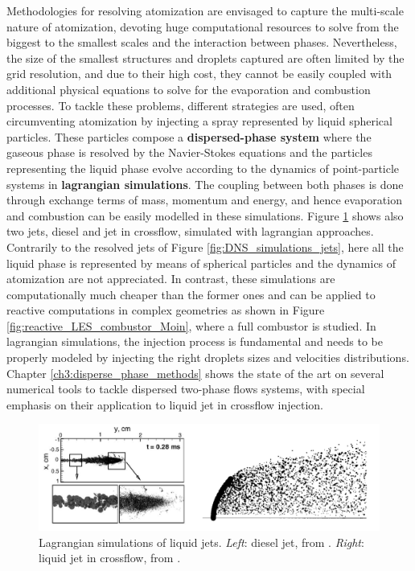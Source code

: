 Methodologies for resolving atomization are envisaged to capture the multi-scale nature of atomization, devoting huge computational resources to solve from the biggest to the smallest scales and the interaction between phases. Nevertheless, the size of the smallest structures and droplets captured are often limited by the grid resolution, and due to their high cost, they cannot be easily coupled with additional physical equations to solve for the evaporation and combustion processes. To tackle these problems, different strategies are used, often circumventing atomization by injecting a spray represented by liquid spherical particles. These particles compose a \textbf{dispersed-phase system} where the gaseous phase is resolved by the Navier-Stokes equations and the particles representing the liquid phase evolve according to the dynamics of point-particle systems in \textbf{lagrangian simulations}. The coupling between both phases is done through exchange terms of mass, momentum and energy, and hence evaporation and combustion can be easily modelled in these simulations. Figure \ref{fig:lagrangian_simulations_jets} shows also two jets, diesel and jet in crossflow, simulated with lagrangian approaches. Contrarily to the resolved jets of Figure \ref{fig:DNS_simulations_jets}, here all the liquid phase is represented by means of spherical particles and the dynamics of atomization are not appreciated. In contrast, these simulations are computationally much cheaper than the former ones and can be applied to reactive computations in complex geometries as shown in Figure \ref{fig:reactive_LES_combustor_Moin}, where a full combustor is studied. In lagrangian simulations, the injection process is fundamental and needs to be properly modeled by injecting the right droplets sizes and velocities distributions. Chapter \ref{ch3:disperse_phase_methods} shows the state of the art on several numerical tools to tackle dispersed two-phase flows systems, with special emphasis on their application to liquid jet in crossflow injection.

\begin{figure}[h!]
	\centering
   \includegraphics[scale=0.5]{./part0_intro/jets_lagrangian_simulations}
	\caption[Lagrangian simulations of liquid jets.]{Lagrangian simulations of liquid jets. \textsl{Left}: diesel jet, from  . \textsl{Right}: liquid jet in crossflow, from .}
	\label{fig:lagrangian_simulations_jets}
\end{figure}

